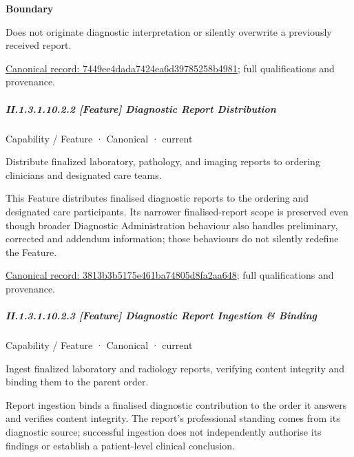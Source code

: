 \textbf{Boundary}



Does not originate diagnostic interpretation or silently overwrite a previously received report.


{\footnotesize \href{../../../../continuum/strategy/capability/feature/7449ee4dada7424ea6d39785258b4981.md}{Canonical record: 7449ee4dada7424ea6d39785258b4981}; full qualifications and provenance.}\par
\subparagraph*{II.1.3.1.10.2.2 [Feature] Diagnostic Report Distribution}
\label{navigation:II.1.3.1.10.2.2}

\label{element:3813b3b5175e461ba74805d8fa2aa648}
{\small Capability / Feature · Canonical · current}\par

Distribute finalized laboratory, pathology, and imaging reports to ordering clinicians and designated care teams.



This Feature distributes finalised diagnostic reports to the ordering and designated care participants. Its narrower finalised-report scope is preserved even though broader Diagnostic Administration behaviour also handles preliminary, corrected and addendum information; those behaviours do not silently redefine the Feature.


{\footnotesize \href{../../../../continuum/strategy/capability/feature/3813b3b5175e461ba74805d8fa2aa648.md}{Canonical record: 3813b3b5175e461ba74805d8fa2aa648}; full qualifications and provenance.}\par
\subparagraph*{II.1.3.1.10.2.3 [Feature] Diagnostic Report Ingestion \& Binding}
\label{navigation:II.1.3.1.10.2.3}

\label{element:a00823445a8a44c1a00f3ec93a7e0e6f}
{\small Capability / Feature · Canonical · current}\par

Ingest finalized laboratory and radiology reports, verifying content integrity and binding them to the parent order.



Report ingestion binds a finalised diagnostic contribution to the order it answers and verifies content integrity. The report's professional standing comes from its diagnostic source; successful ingestion does not independently authorise its findings or establish a patient-level clinical conclusion.


